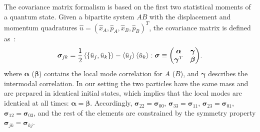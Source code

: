 \documentclass[aps,prl,reprint,superscriptaddress,nofootinbib,floatfix]{revtex4-2}
\begin{document}
The covariance matrix formalism is based on the first two statistical moments of a quantum state. Given a bipartite system $AB$ with the displacement and momentum quadratures $ \hat u = ( \hat x_A, \hat p_A, \hat x_B, \hat p_B)^T$, the covariance matrix is defined as~\cite{Negativity-Vidal2002,Negativity-CV-Serafini2004,Negativity-Gaussian-Adesso2005}:
\begin{equation}
	\bm{\sigma}_{jk}  = \frac{1}{2} \ev{ \acomm{\hat u_j}{\hat u_k} }  -  \ev{ \hat u_j }\ev{ \hat u_k } 
 : \bm{\sigma} \equiv \mqty(
	\bm{\alpha} & \bm{\gamma} \\
	\bm{\gamma}^T & \bm{\beta}
	).
\end{equation}
where $\bm{\alpha}$ ($\bm{\beta}$) contains the local mode correlation for $A$ ($B$), and $\bm{\gamma}$ describes the intermodal correlation. 
In our setting the two particles have the same mass and are prepared in identical initial states, which implies that the local modes are identical at all times: $\bm{\alpha} = \bm{\beta}$.
Accordingly, $\bm{\sigma}_{22} = \bm{\sigma}_{00}$, $\bm{\sigma}_{33} = \bm{\sigma}_{11}$, $\bm{\sigma}_{23} = \bm{\sigma}_{01}$, $\bm{\sigma}_{12} = \bm{\sigma}_{03}$, 
and the rest of the elements are constrained by the symmetry property $\bm{\sigma}_{jk} = \bm{\sigma}_{kj}$.
\end{document}
